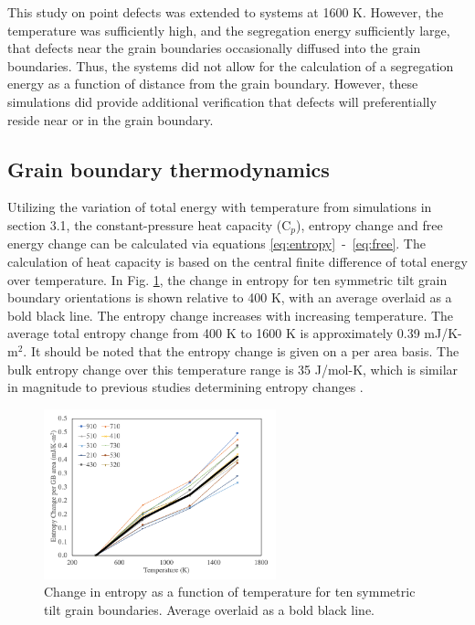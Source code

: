 \documentclass[review]{elsarticle}
\providecommand{\DIFdelend}{} %
\DeclareRobustCommand{\DIFdelend}{\DIFOaddend \let\includegraphics\DIFOincludegraphics} %
\begin{document}
\DIFdelend This study on point defects was extended to systems at 1600 K. However, the temperature was sufficiently high, and the segregation energy sufficiently large, that defects near the grain boundaries occasionally diffused into the grain boundaries. Thus, the systems did not allow for the calculation of a segregation energy as a function of distance from the grain boundary. However, these simulations did provide additional verification that defects will preferentially reside near or in the grain boundary. 

\FloatBarrier

\subsection{Grain boundary thermodynamics}

Utilizing the variation of total energy with temperature from simulations in section 3.1, the constant-pressure heat capacity (C$_{p}$), entropy change and free energy change can be calculated via equations \ref{eq:entropy}~-~\ref{eq:free}. The calculation of heat capacity is based on the central finite difference of total energy over temperature. In Fig. \ref{fig:entropy}, the change in entropy for ten symmetric tilt grain boundary orientations is shown relative to 400 K, with an average overlaid as a bold black line. The entropy change increases with increasing temperature. The average total entropy change from 400 K to 1600 K is approximately 0.39 mJ/K-m$^{2}$. It should be noted that the entropy change is given on a per area basis. The bulk entropy change over this temperature range is 35 J/mol-K, which is similar in magnitude to previous studies determining entropy changes \cite{mcnutt2014, peter2004}. 

\begin{figure}[h]
 \centering
 \includegraphics[width=0.6\textwidth]{entropy.png} 
 \caption{Change in entropy as a function of temperature for ten symmetric tilt grain boundaries. Average overlaid as a bold black line. }
 \label{fig:entropy}
\end{figure}
\end{document}

